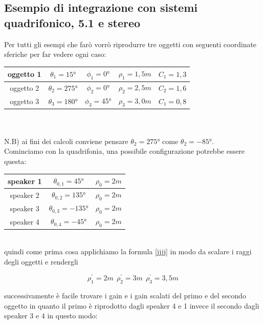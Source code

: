 \documentclass[12pt,a4paper]{report}
\begin{document}
\subsection{Esempio di integrazione con sistemi quadrifonico, 5.1 e stereo}

Per tutti gli esempi che farò vorrò riprodurre tre oggetti con seguenti coordinate sferiche per far vedere ogni caso:\\

\begin{tabular}{|c|c|c|c|c|}
\hline 
oggetto 1 & $\theta_1=15°$ & $\phi_1=0°$ & $\rho_1=1,5m$ & $C_1=1,3$ \\ 
\hline 
oggetto 2 & $\theta_2=275°$ & $\phi_2=0°$ & $\rho_2=2,5m$ & $C_2=1,6$ \\ 
\hline 
oggetto 3 & $\theta_3=180°$ & $\phi_3=45°$ & $\rho_3=3,0m$ & $C_1=0,8$ \\ 
\hline 

\end{tabular} \\ \\
 
N.B) ai fini dei calcoli conviene pensare $\theta_2=275°$ come $\theta_2=-85°$.\\

Cominciamo con la quadrifonia, una possibile configurazione potrebbe essere questa:\\

\begin{tabular}{|c|c|c|}
\hline 
speaker 1 & $\theta_{0,1}=45°$ & $\rho_0=2m$\\ 
\hline 
speaker 2 & $\theta_{0,2}=135°$ & $\rho_0=2m$\\ 
\hline 
speaker 3 & $\theta_{0,3}=-135°$ & $\rho_0=2m$\\ 
\hline 
speaker 4 & $\theta_{0,4}=-45°$ & $\rho_0=2m$\\ 
\hline 
\end{tabular} \\

quindi come prima cosa applichiamo la formula \ref{jjjj} in modo da scalare i raggi degli oggetti e rendergli

\[\rho_1^{\prime}=2m \ \  \rho_2^{\prime}=3m \ \ \rho_3^{\prime}=3,5m  \]

successivamente è facile trovare i gain e i gain scalati del primo e del secondo oggetto in quanto il primo è riprodotto dagli speaker 4 e 1 invece il secondo dagli speaker 3 e 4 in questo modo:\\
\end{document}
